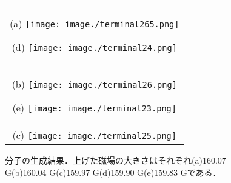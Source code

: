 \documentclass[11pt,a4j,notitlepage]{jreport}
\begin{document}
\begin{figure}[H]
	\begin{tabular}{c}
		\begin{minipage}[t]{0.5\hsize}
			\centering
			(a)
				\texttt{[image: image./terminal265.png]}
		\end{minipage}
		\begin{minipage}[t]{0.5\hsize}
			\centering
			(d)
				\texttt{[image: image./terminal24.png]}
		\end{minipage} \\
		\begin{minipage}[t]{0.5\hsize}
			\centering
			(b)
				\texttt{[image: image./terminal26.png]}
		\end{minipage}
		\begin{minipage}[t]{0.5\hsize}
			\centering
			(e)
				\texttt{[image: image./terminal23.png]}
		\end{minipage} \\
		\begin{minipage}[t]{1\hsize}
			(c)
				\texttt{[image: image./terminal25.png]}
		\end{minipage} 
	\end{tabular}
	\caption{分子の生成結果．上げた磁場の大きさはそれぞれ(a)160.07 G(b)160.04 G(c)159.97 G(d)159.90 G(e)159.83 Gである．}
	\label{fig4.3.3}
\end{figure}
\end{document}
